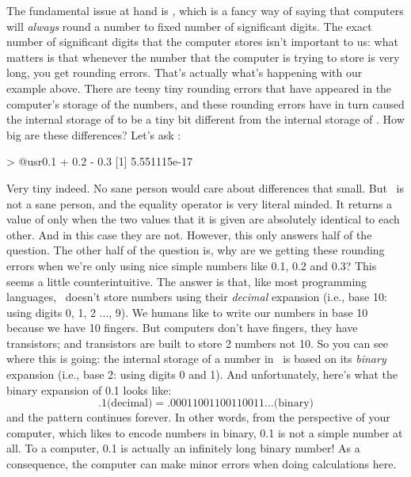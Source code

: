 The fundamental issue at hand is , which is a fancy way of saying that computers will {\it always} round a number to fixed number of significant digits. The exact number of significant digits that the computer stores isn't important to us: what matters is that whenever the number that the computer is trying to store is very long, you get rounding errors. That's actually what's happening with our example above. There are teeny tiny rounding errors that have appeared in the computer's storage of the numbers, and these rounding errors have in turn caused the internal storage of  to be a tiny bit different from the internal storage of . How big are these differences? Let's ask \R:
\begin{rblock1}
> @usr{0.1 + 0.2 - 0.3}
[1] 5.551115e-17
\end{rblock1}
Very tiny indeed. No sane person would care about differences that small. But \R\ is not a sane person, and the equality operator \rtext{==} is very literal minded. It returns a value of  only when the two values that it is given are absolutely identical to each other. And in this case they are not. However, this only answers half of the question. The other half of the question is, why are we getting these rounding errors when we're only using nice simple numbers like 0.1, 0.2 and 0.3? This seems a little counterintuitive. The answer is that, like most programming languages, \R\ doesn't store numbers using their {\it decimal} expansion (i.e., base 10: using digits 0, 1, 2 ..., 9). We humans like to write our numbers in base 10 because we have 10 fingers. But computers don't have fingers, they have transistors; and transistors are built to store 2 numbers not 10. So you can see where this is going: the internal storage of a number in \R\ is based on its {\it binary} expansion (i.e., base 2: using digits 0 and 1). And unfortunately, here's what the binary expansion of 0.1 looks like:
$$
.1 \mbox{(decimal)} = .00011001100110011\ldots \mbox{(binary)} 
$$ 
and the pattern continues forever. In other words, from the perspective of your computer, which likes to encode numbers in binary, 0.1 is not a simple number at all. To a computer, 0.1 is actually an infinitely long binary number! As a consequence, the computer can make minor errors when doing calculations here. 

